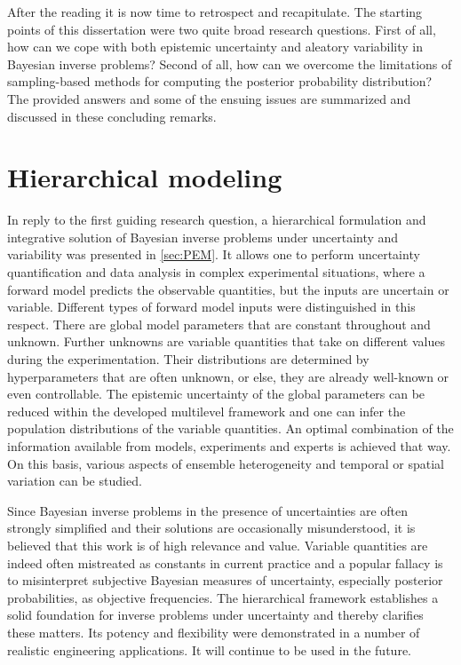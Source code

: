 After the reading it is now time to retrospect and recapitulate.
The starting points of this dissertation were two quite broad research questions.
First of all, how can we cope with both epistemic uncertainty and aleatory variability in Bayesian inverse problems?
Second of all, how can we overcome the limitations of sampling-based methods for computing the posterior probability distribution?
The provided answers and some of the ensuing issues are summarized and discussed in these concluding remarks.

\section{Hierarchical modeling}
In reply to the first guiding research question, a hierarchical formulation and integrative solution of Bayesian inverse problems under uncertainty and variability was presented in \cref{sec:PEM}.
It allows one to perform uncertainty quantification and data analysis in complex experimental situations,
where a forward model predicts the observable quantities, but the inputs are uncertain or variable.
Different types of forward model inputs were distinguished in this respect.
There are global model parameters that are constant throughout and unknown.
Further unknowns are variable quantities that take on different values during the experimentation.
Their distributions are determined by hyperparameters that are often unknown, or else, they are already well-known or even controllable.
The epistemic uncertainty of the global parameters can be reduced within the developed multilevel framework and one can infer the population distributions of the variable quantities.
An optimal combination of the information available from models, experiments and experts is achieved that way.
On this basis, various aspects of ensemble heterogeneity and temporal or spatial variation can be studied.
\par %
Since Bayesian inverse problems in the presence of uncertainties are often strongly simplified and their solutions are occasionally misunderstood,
it is believed that this work is of high relevance and value.
Variable quantities are indeed often mistreated as constants in current practice and a popular fallacy is to misinterpret subjective Bayesian measures of uncertainty,
especially posterior probabilities, as objective frequencies.
The hierarchical framework establishes a solid foundation for inverse problems under uncertainty and thereby clarifies these matters.
Its potency and flexibility were demonstrated in a number of realistic engineering applications.
It will continue to be used in the future.


